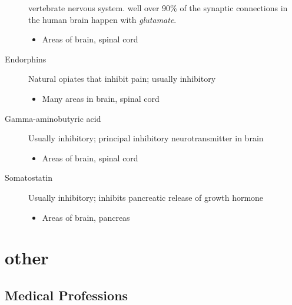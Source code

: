 \documentclass[11pt]{article}
\begin{document}
\begin{description}
vertebrate nervous system. well over 90\% of the synaptic connections in
the human brain happen with \emph{glutamate}.
\begin{itemize}
\item Areas of brain, spinal cord
\end{itemize}
\item[{Endorphins}] Natural opiates that inhibit pain; usually inhibitory
\begin{itemize}
\item Many areas in brain, spinal cord
\end{itemize}
\item[{Gamma-aminobutyric acid}] Usually inhibitory; principal inhibitory
neurotransmitter in brain
\begin{itemize}
\item Areas of brain, spinal cord
\end{itemize}
\item[{Somatostatin}] Usually inhibitory; inhibits pancreatic release of growth
hormone
\begin{itemize}
\item Areas of brain, pancreas
\end{itemize}
\end{description}

\section{other}
\label{sec:org4219286}
\subsection{Medical Professions}
\label{sec:orga452b23}
\end{document}
